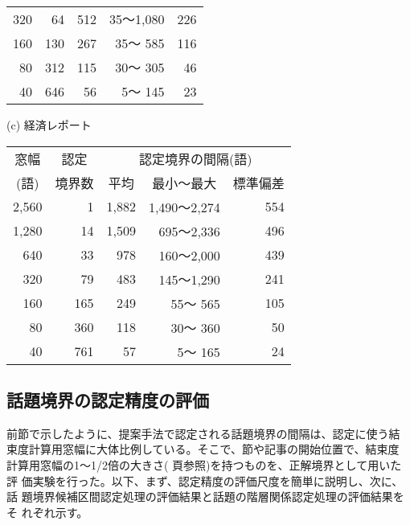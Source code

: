 \begin{table}[htbp]
\begin{center}
\begin{tabular}{|r|r|r|r|r|}
        320 &   64 &   512 &    35〜1,080 &   226 \\
        160 &  130 &   267 &    35〜  585 &   116 \\
         80 &  312 &   115 &    30〜  305 &    46 \\
         40 &  646 &    56 &     5〜  145 &    23 \\
      \hline
    \end{tabular}
  \end{center}
  \begin{center}
    (c) 経済レポート\\
    \medskip{}
    \begin{tabular}{|r|r|r|r|r|}
      \hline
      \multicolumn{1}{|c|}{窓幅}
      & \multicolumn{1}{c|}{認定}
      & \multicolumn{3}{c|}{認定境界の間隔(語)}\\
      \cline{3-5}
      \multicolumn{1}{|c|}{(語)}
      & \multicolumn{1}{c|}{境界数}
      & \multicolumn{1}{c|}{平均}
      & \multicolumn{1}{c|}{最小〜最大}
      & \multicolumn{1}{c|}{標準偏差}\\
      \hline
      2,560 &   1 & 1,882 & 1,490〜2,274 &  554 \\
      1,280 &  14 & 1,509 &   695〜2,336 &  496 \\
        640 &  33 &   978 &   160〜2,000 &  439 \\
        320 &  79 &   483 &   145〜1,290 &  241 \\
        160 & 165 &   249 &    55〜  565 &  105 \\
         80 & 360 &   118 &    30〜  360 &   50 \\
         40 & 761 &    57 &     5〜  165 &   24 \\
      \hline
    \end{tabular}
  \end{center}
\end{table}

\subsection{話題境界の認定精度の評価}
\label{sect:話題境界の認定精度の評価}

前節で示したように、提案手法で認定される話題境界の間隔は、認定に使う結
束度計算用窓幅に大体比例している。そこで、節や記事の開始位置で、結束度
計算用窓幅の1〜1/2倍の大きさ(
\pageref{loc:境界の大きさ}頁参照)を持つものを、正解境界として用いた評
価実験を行った。以下、まず、認定精度の評価尺度を簡単に説明し、次に、話
題境界候補区間認定処理の評価結果と話題の階層関係認定処理の評価結果をそ
れぞれ示す。

